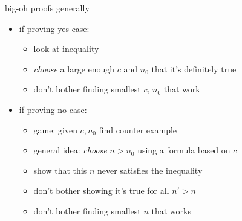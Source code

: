 \begin{frame}{big-oh proofs generally}
    \begin{itemize}
    \item if proving yes case: 
        \begin{itemize}
        \item look at inequality
        \item \textit{choose} a large enough $c$ and $n_0$ that it's definitely true
        \item don't bother finding smallest $c$, $n_0$ that work
        \end{itemize}
    \item if proving no case:
        \begin{itemize}
        \item game: given $c, n_0$ find counter example
        \item general idea: \textit{choose} $n > n_0$ using a formula based on $c$
        \item show that this $n$ never satisfies the inequality
        \item don't bother showing it's true for all $n' > n$
        \item don't bother finding smallest $n$ that works
        \end{itemize}
    \end{itemize}
\end{frame}
